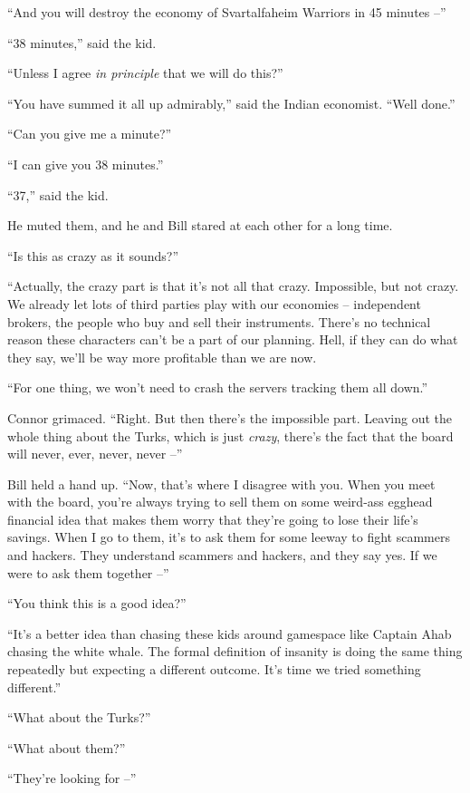 ``And you will destroy the economy of Svartalfaheim Warriors in 45
minutes --''

``38 minutes,'' said the kid.

``Unless I agree \emph{in principle} that we will do this?''

``You have summed it all up admirably,'' said the Indian economist.
``Well done.''

``Can you give me a minute?''

``I can give you 38 minutes.''

``37,'' said the kid.

He muted them, and he and Bill stared at each other for a long
time.

``Is this as crazy as it sounds?''

``Actually, the crazy part is that it's not all that crazy.
Impossible, but not crazy. We already let lots of third parties
play with our economies -- independent brokers, the people who buy
and sell their instruments. There's no technical reason these
characters can't be a part of our planning. Hell, if they can do
what they say, we'll be way more profitable than we are now.

``For one thing, we won't need to crash the servers tracking them
all down.''

Connor grimaced. ``Right. But then there's the impossible part.
Leaving out the whole thing about the Turks, which is just
\emph{crazy}, there's the fact that the board will never, ever,
never, never --''

Bill held a hand up. ``Now, that's where I disagree with you. When
you meet with the board, you're always trying to sell them on some
weird-ass egghead financial idea that makes them worry that they're
going to lose their life's savings. When I go to them, it's to ask
them for some leeway to fight scammers and hackers. They understand
scammers and hackers, and they say yes. If we were to ask them
together --''

``You think this is a good idea?''

``It's a better idea than chasing these kids around gamespace like
Captain Ahab chasing the white whale. The formal definition of
insanity is doing the same thing repeatedly but expecting a
different outcome. It's time we tried something different.''

``What about the Turks?''

``What about them?''

``They're looking for --''


